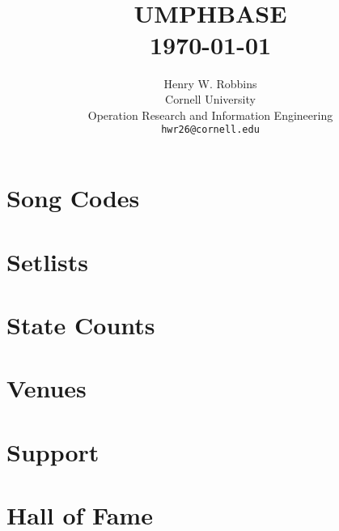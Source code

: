 \documentclass[8pt]{book}
\title{	\normalsize \textsc{} 					%
        \\[2.0cm]								
        \HRule{2pt} \\ [0.5cm]		
	\Huge \textbf{\uppercase{UMPHBASE}}	%
	\HRule{2pt} \\ [0.5cm]
	\large \today						%
}
\author{
	Henry W. Robbins\\	
	Cornell University\\	
	Operation Research and Information Engineering\\
        \texttt{hwr26@cornell.edu} \\
}
\makeatletter
\let\mcnewpage=\newpage
\newcommand{\TrickSupertabularIntoMulticols}{
\renewcommand\newpage{
    \if@firstcolumn
        \hrule width\linewidth height0pt
            \columnbreak
        \else
          \mcnewpage
        \fi
}}
\def\printtitle{%
    {\centering \@title\par}}
\def\printauthor{					
    {\centering \large \@author}}
\makeatother
\begin{document}
\thispagestyle{empty}		
\printtitle					
\vfill
\printauthor				
\newpage

\tableofcontents
\newpage

\chapter{Song Codes}

\begin{multicols*}{4}
\TrickSupertabularIntoMulticols
\begin{footnotesize}

\end{footnotesize}
\end{multicols*}

\chapter{Setlists}

%

\chapter{State Counts}

\begin{multicols*}{2}
\TrickSupertabularIntoMulticols

\end{multicols*}

\chapter{Venues}

\begin{multicols*}{3}
\TrickSupertabularIntoMulticols

\end{multicols*}


\chapter{Support}

\begin{multicols*}{3}
\TrickSupertabularIntoMulticols

\end{multicols*}

\chapter{Hall of Fame}

\begin{multicols*}{5}
\TrickSupertabularIntoMulticols

\end{multicols*}
\end{document}
